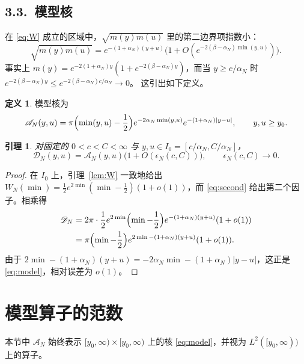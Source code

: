\documentclass[12pt,a4paper]{amsart}
\numberwithin{equation}{section}
\theoremstyle{plain}
\newtheorem{lemma}[theorem]{引理}
\theoremstyle{definition}
\newtheorem{definition}[theorem]{定义}
\begin{document}
\subsection*{3.3.\ 模型核}

在 \eqref{eq:W} 成立的区域中，$\sqrt{m(y)m(u)}$ 里的第二边界项指数小：
\begin{equation}\label{eq:second}
 \sqrt{m(y)m(u)}
 =e^{-(1+\alpha_N)(y+u)}
 \bigl(1+O(e^{-2(\beta-\alpha_N)\min(y,u)})\bigr).
\end{equation}
事实上 $m(y)=e^{-2(1+\alpha_N)y}(1+e^{-2(\beta-\alpha_N)y})$，而当
$y\ge c/\alpha_N$ 时 $e^{-2(\beta-\alpha_N)y}\le e^{-2(\beta-\alpha_N)c/\alpha_N}\to0$。
这引出如下定义。

\begin{definition}\label{def:model}
模型核为
\begin{equation}\label{eq:model}
 \mathscr A_N(y,u)=\pi\Bigl(\min(y,u)-\frac12\Bigr)
 e^{-2\alpha_N\min(y,u)}e^{-(1+\alpha_N)|y-u|},
 \qquad y,u\ge y_0 .
\end{equation}
\end{definition}

\begin{lemma}\label{lem:close}
对固定的 $0<c<C<\infty$ 与 $y,u\in I_0=[c/\alpha_N,C/\alpha_N]$，
\begin{equation}\label{eq:close}
 \mathscr D_N(y,u)=\mathscr A_N(y,u)\bigl(1+O(\epsilon_N(c,C))\bigr),
 \qquad \epsilon_N(c,C)\longrightarrow0 .
\end{equation}
\end{lemma}

\begin{proof}
在 $I_0$ 上，引理~\ref{lem:W} 一致地给出
$W_N(\min)=\frac12e^{2\min}(\min-\frac12)(1+o(1))$，而 \eqref{eq:second}
给出第二个因子。相乘得
\[
 \begin{aligned}
 \mathscr D_N
 &=2\pi\cdot\frac12 e^{2\min}\Bigl(\min-\frac12\Bigr)e^{-(1+\alpha_N)(y+u)}(1+o(1))\\
 &=\pi\Bigl(\min-\frac12\Bigr)e^{2\min-(1+\alpha_N)(y+u)}(1+o(1)).
 \end{aligned}
\]
由于 $2\min-(1+\alpha_N)(y+u)=-2\alpha_N\min-(1+\alpha_N)|y-u|$，这正是
\eqref{eq:model}，相对误差为 $o(1)$。
\end{proof}

\section{模型算子的范数}\label{sec:model}

本节中 $\mathscr A_N$ 始终表示 $[y_0,\infty)\times[y_0,\infty)$ 上的核
\eqref{eq:model}，并视为 $L^2([y_0,\infty))$ 上的算子。
\end{document}
